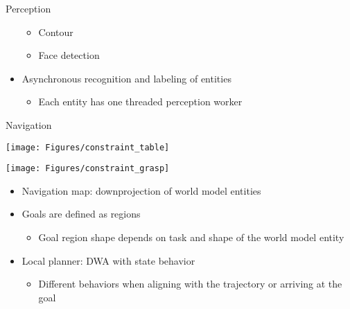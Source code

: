 \documentclass[a4paper,12pt]{article}
\newcommand{\emptylogo}{\texttt{[image: Figures/Empty]}}
\begin{document}
\begin{slidetop}
\begin{multicols}{2}
\begin{bclogo}[couleur = white, arrondi = 0.25, couleurBord = tuedarkblue, epBarre = 0, logo=\emptylogo]{\textcolor{tuedarkblue}{Perception}}
\begin{itemize}[itemsep = 0pt, parsep = 0pt, leftmargin=15pt]
\begin{itemize}[itemsep = 0pt, parsep = 0pt, leftmargin=15pt]
		\item Contour
		\item Face detection
	\end{itemize}
	\item Asynchronous recognition and labeling of entities 
	\begin{itemize}[itemsep = 0pt, parsep = 0pt, leftmargin=15pt]
		\item Each entity has one threaded perception worker
	\end{itemize}
\end{itemize}
\end{bclogo}
\vfill
\begin{bclogo}[couleur = white, arrondi = 0.25, couleurBord = tuedarkblue, epBarre = 0, logo=\emptylogo]{\textcolor{tuedarkblue}{Navigation}}
\bigskip
\begin{minipage}[T]{0.48\textwidth}
    \begin{center}
        \texttt{[image: Figures/constraint\_table]}
    \end{center}
\end{minipage}
\hfill
\begin{minipage}[T]{0.48\textwidth}
    \begin{center}
        \texttt{[image: Figures/constraint\_grasp]}
    \end{center}
\end{minipage}
\begin{itemize}[itemsep = 0pt, parsep = 0pt, leftmargin=15pt]
	\item Navigation map: downprojection of world model entities
    \item Goals are defined as regions
    \begin{itemize}[itemsep = 0pt, parsep = 0pt, leftmargin=15pt]
    	\item Goal region shape depends on task and shape of the world model entity
    \end{itemize}
    \item Local planner: DWA with state behavior
    \begin{itemize}[itemsep = 0pt, parsep = 0pt, leftmargin=15pt]
    	\item Different behaviors when aligning with the trajectory or arriving at the goal
    \end{itemize}
\end{itemize}

\end{bclogo}
%
\end{multicols}
\end{slidetop}
\end{document}
